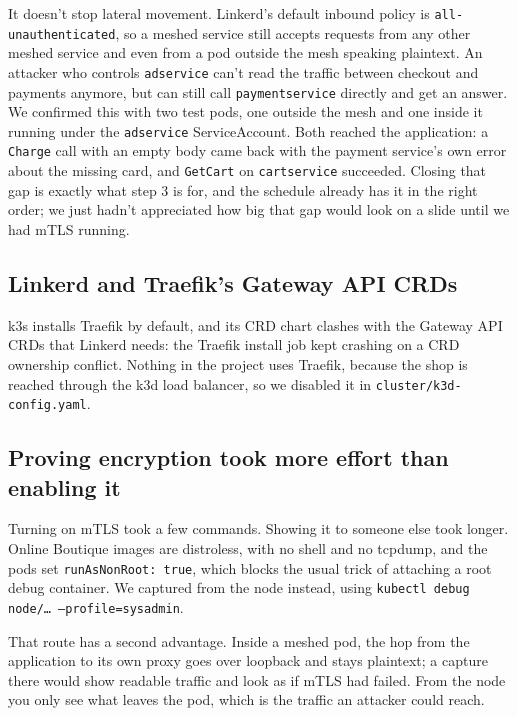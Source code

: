 \documentclass[12pt,a4paper]{article}
\begin{document}
It doesn't stop lateral movement. Linkerd's default inbound policy is
\texttt{all-unauthenticated}, so a meshed service still accepts requests from
any other meshed service and even from a pod outside the mesh speaking
plaintext. An attacker who controls \texttt{adservice} can't read the traffic
between checkout and payments anymore, but can still call
\texttt{paymentservice} directly and get an answer. We confirmed this with two
test pods, one outside the mesh and one inside it running under the
\texttt{adservice} ServiceAccount. Both reached the application: a
\texttt{Charge} call with an empty body came back with the payment service's
own error about the missing card, and \texttt{GetCart} on
\texttt{cartservice} succeeded. Closing that gap
is exactly what step 3 is for, and the schedule already has it in the right
order; we just hadn't appreciated how big that gap would look on a slide
until we had mTLS running.

\subsection*{Linkerd and Traefik's Gateway API CRDs}

k3s installs Traefik by default, and its CRD chart clashes with the Gateway API
CRDs that Linkerd needs: the Traefik install job kept crashing on a CRD
ownership conflict. Nothing in the project uses Traefik, because the shop is
reached through the k3d load balancer, so we disabled it in
\texttt{cluster/k3d-config.yaml}.

\subsection*{Proving encryption took more effort than enabling it}

Turning on mTLS took a few commands. Showing it to someone else took longer.
Online Boutique images are distroless, with no shell and no tcpdump, and the
pods set \texttt{runAsNonRoot: true}, which blocks the usual trick of
attaching a root debug container. We captured from the node instead, using
\texttt{kubectl debug node/\ldots{} --profile=sysadmin}.

That route has a second advantage. Inside a meshed pod, the hop from the
application to its own proxy goes over loopback and stays plaintext; a
capture there would show readable traffic and look as if mTLS had failed.
From the node you only see what leaves the pod, which is the traffic an
attacker could reach.
\end{document}
